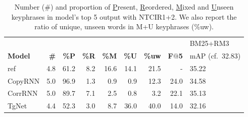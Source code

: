 \begin{table*}[!ht]
    \centering
    \begin{tabular}{lrrrrrr|rl}
    \\
    \midrule
     & & & & & & & & BM25+RM3 \\
    \textbf{Model} & \textbf{\#} & \textbf{\%P} & \textbf{\%R} & \textbf{\%M} & \textbf{\%U} & \textbf{\%uw} &  \textbf{F$@$5} & mAP {\small (cf.~32.83)} \\
    \midrule
                 
        ref
                 & 4.8 & 61.2 &  8.2 & 16.6 & 14.1 & 21.5 &    - & 35.22 \\
        CopyRNN
                 & 5.0 & 96.9 &  1.3 &  0.9 &  0.9 & 12.3 & 24.0 & 34.58 \\
        CorrRNN
                 & 5.0 & 89.7 &  7.1 &  2.5 &  0.8 &  3.2 & 22.1 & 35.13 \\
        TgNet
                 & 4.4 & 52.3 &  3.0 &  8.7 & 36.0 & 40.0 & 14.0 & 32.16 \\
    \bottomrule
    \end{tabular}
    \caption{Number (\#) and proportion of \underline{P}resent, \underline{R}eordered, \underline{M}ixed and \underline{U}nseen keyphrases in model's top 5 output with NTCIR1+2. We also report the ratio of unique, unseen words in M+U keyphrases (\%uw).}
    \label{tab:perf-dist-model}
\end{table*}
